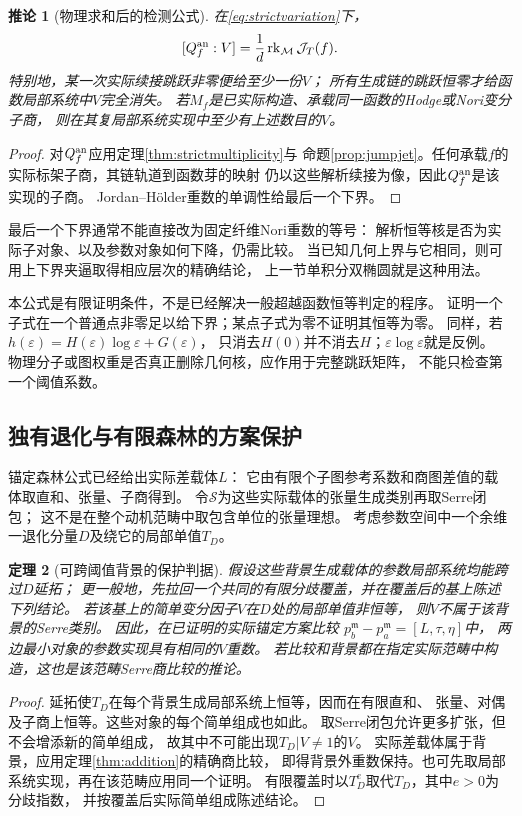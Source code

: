 \documentclass[11pt,a4paper]{ctexart}
\theoremstyle{cnplain}\newtheorem{theorem}{定理}[section]
\newtheorem{corollary}[theorem]{推论}
\theoremstyle{definition}\newtheorem{definition}[theorem]{定义}
\theoremstyle{remark}\newtheorem{remark}[theorem]{注}
\newcommand{\cS}{\mathcal S}\newcommand{\dR}{\mathrm{dR}}
\newcommand{\rk}{\operatorname{rk}}\newcommand{\im}{\operatorname{im}}
\begin{document}
\begin{corollary}[物理求和后的检测公式]\label{cor:physicalmultiplicity}
在\eqref{eq:strictvariation}下，
\begin{equation}\label{eq:functionmultiplicity}
 [Q_f^{\rm an}:V]=\frac{1}{d}\rk_{\mathcal M}\mathcal J_T(f).
\end{equation}
特别地，某一次实际续接跳跃非零便给至少一份$V$；
所有生成链的跳跃恒零才给函数局部系统中$V$完全消失。
若$M_f$是已实际构造、承载同一函数的Hodge或Nori变分子商，
则在其复局部系统实现中至少有上述数目的$V$。
\end{corollary}
\begin{proof}
对$Q_f^{\rm an}$应用定理\ref{thm:strictmultiplicity}与
命题\ref{prop:jumpjet}。任何承载$f$的实际标架子商，其链轨道到函数芽的映射
仍以这些解析续接为像，因此$Q_f^{\rm an}$是该实现的子商。
Jordan--Hölder重数的单调性给最后一个下界。
\end{proof}

最后一个下界通常不能直接改为固定纤维Nori重数的等号：
解析恒等核是否为实际子对象、以及参数对象如何下降，仍需比较。
当已知几何上界与它相同，则可用上下界夹逼取得相应层次的精确结论，
上一节单积分双椭圆就是这种用法。

本公式是有限证明条件，不是已经解决一般超越函数恒等判定的程序。
证明一个子式在一个普通点非零足以给下界；某点子式为零不证明其恒等为零。
同样，若$h(\varepsilon)=H(\varepsilon)\log\varepsilon+G(\varepsilon)$，
只消去$H(0)$并不消去$H$；$\varepsilon\log\varepsilon$就是反例。
物理分子或图权重是否真正删除几何核，应作用于完整跳跃矩阵，
不能只检查第一个阈值系数。

\subsection{独有退化与有限森林的方案保护}
锚定森林公式已经给出实际差载体$L$：
它由有限个子图参考系数和商图差值的载体取直和、张量、子商得到。
令$\cS$为这些实际载体的张量生成类别再取Serre闭包；
这不是在整个动机范畴中取包含单位的张量理想。
考虑参数空间中一个余维一退化分量$D$及绕它的局部单值$T_D$。

\begin{theorem}[可跨阈值背景的保护判据]\label{thm:forestthreshold}
假设这些背景生成载体的参数局部系统均能跨过$D$延拓；
更一般地，先拉回一个共同的有限分歧覆盖，并在覆盖后的基上陈述下列结论。
若该基上的简单变分因子$V$在$D$处的局部单值非恒等，
则$V$不属于该背景的Serre类别。
因此，在已证明的实际锚定方案比较
$p_b^{\mathfrak m}-p_a^{\mathfrak m}=[L,\tau,\eta]$中，
两边最小对象的参数实现具有相同的$V$重数。
若比较和背景都在指定实际范畴中构造，这也是该范畴Serre商比较的推论。
\end{theorem}
\begin{proof}
延拓使$T_D$在每个背景生成局部系统上恒等，因而在有限直和、
张量、对偶及子商上恒等。这些对象的每个简单组成也如此。
取Serre闭包允许更多扩张，但不会增添新的简单组成，
故其中不可能出现$T_D|V\ne1$的$V$。
实际差载体属于背景，应用定理\ref{thm:addition}的精确商比较，
即得背景外重数保持。也可先取局部系统实现，再在该范畴应用同一个证明。
有限覆盖时以$T_D^e$取代$T_D$，其中$e>0$为分歧指数，
并按覆盖后实际简单组成陈述结论。
\end{proof}
\end{document}
